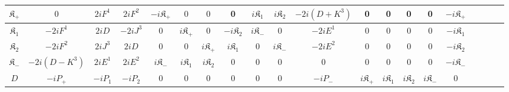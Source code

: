 \documentclass[aps,reprint,notitlepage,nofootinbib,superscriptaddress]{revtex4-1}
\begin{document}
\begin{widetext}
\begin{center}
\begin{table}[h!]
{\begin{tabular}{ |c||c|c|c|c|c|c|c|c|c|c|c|c|c|c|c|c|c|c|c| }
 \hline 
 \rule{0pt}{16pt}$\mathfrak{K}_{{+}}$ &$0$&$2i{F}^{{1}}$&$2i{F}^{{2}}$&$-i\mathfrak{K}_{{+}}$&$0$&$0$&0&$i\mathfrak{K}_{{1}}$&$i\mathfrak{K}_{{2}}$&$-2i(D+K^{{3}})$&0&0&0&0&$-i\mathfrak{K}_{{+}}$\\
 \hline 
 \rule{0pt}{16pt}$\mathfrak{K}_{{1}}$ &$-2i{F}^{{1}}$&$2iD$&$-2iJ^{{3}}$&0&$i\mathfrak{K}_{{+}}$&0&$-i\mathfrak{K}_{{2}}$&$i\mathfrak{K}_{{-}}$&0&$-2i{E}^{{1}}$&0&0&0&0&$-i\mathfrak{K}_{{1}}$\\
 \hline 
 \rule{0pt}{16pt}$\mathfrak{K}_{{2}}$ &$-2i{F}^{{2}}$&$2iJ^{{3}}$&$2iD$&0&0&$i\mathfrak{K}_{{+}}$&$i\mathfrak{K}_{{1}}$&0&$i\mathfrak{K}_{{-}}$&$-2i{E}^{{2}}$&0&0&0&0&$-i\mathfrak{K}_{{2}}$\\
 \hline 
 \rule{0pt}{16pt}$\mathfrak{K}_{{-}}$ &$-2i(D-K^{{3}})$&$2i{E}^{{1}}$&$2i{E}^{{2}}$&$i\mathfrak{K}_{{-}}$&$i\mathfrak{K}_{{1}}$&$i\mathfrak{K}_{{2}}$&0&$0$&$0$&$0$&0&0&0&0&$-i\mathfrak{K}_{{-}}$\\
 \hline 
 \rule{0pt}{16pt}$D$ &$-iP_{{+}}$&$-iP_{{1}}$&$-iP_{{2}}$&0&0&0&0&0&0&$-iP_{{-}}$&$i\mathfrak{K}_{{+}}$&$i\mathfrak{K}_{{1}}$&$i\mathfrak{K}_{{2}}$&$i\mathfrak{K}_{{-}}$&0\\
 \hline
\end{tabular}}
\end{table}
\end{center}
\end{widetext}
\end{document}
